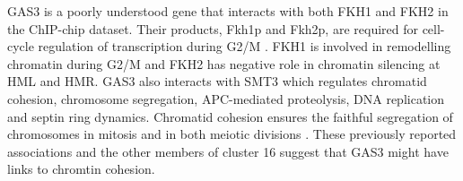 \documentclass[]{article}
\begin{document}
GAS3 is a poorly understood gene that interacts with both FKH1 and FKH2 in the ChIP-chip dataset. Their products,  Fkh1p and Fkh2p,  are required for cell-cycle regulation of transcription during G2/M \citep{kumar2000forkhead}. FKH1 is involved in remodelling chromatin during G2/M and FKH2 has negative role in chromatin silencing at HML and HMR. GAS3 also interacts with SMT3 which regulates chromatid cohesion, chromosome segregation, APC-mediated proteolysis, DNA replication and septin ring dynamics. Chromatid cohesion ensures the faithful segregation of chromosomes in mitosis and in both meiotic divisions \citep{cooper2009pds1p}. These previously reported associations and the other members of cluster 16 suggest that GAS3 might have links to chromtin cohesion.






\end{document}
